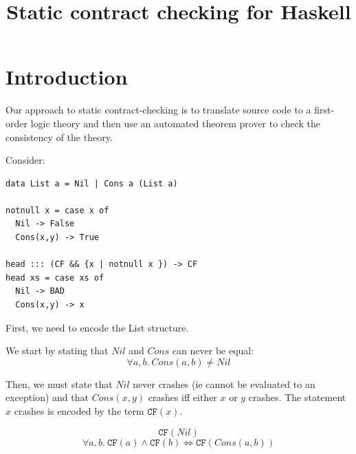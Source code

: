 \documentclass[preprint]{sigplanconf}
\begin{document}
\newcommand{\etrans}[1]{\mathcal{E} \llbracket #1 \rrbracket}
\newcommand{\dtrans}[1]{\mathcal{D} \llbracket #1 \rrbracket}
\newcommand{\ttrans}[1]{\mathcal{T} \llbracket #1 \rrbracket}
\newcommand{\strans}[1]{\mathcal{S} \llbracket #1 \rrbracket}
\newcommand{\trans}[1]{\llbracket #1 \rrbracket}

\newcommand{\unr}{\texttt{UNR}}
\newcommand{\bad}{\texttt{BAD}}
\newcommand{\any}{\texttt{Any}}
\newcommand{\ok}{\texttt{Ok}}
\newcommand{\hprime}{\mathcal{H}'}
\newcommand{\cf}[1]{\texttt{CF}(#1)}
\newcommand{\cfc}{\texttt{CF}}

\title{Static contract checking for Haskell}
\maketitle

\section{Introduction}

Our approach to static contract-checking is to translate source code
to a first-order logic theory and then use an automated theorem prover
to check the consistency of the theory.

Consider:
\begin{verbatim}
data List a = Nil | Cons a (List a)

notnull x = case x of
  Nil -> False
  Cons(x,y) -> True

head ::: (CF && {x | notnull x }) -> CF
head xs = case xs of
  Nil -> BAD
  Cons(x,y) -> x
\end{verbatim}

First, we need to encode the List structure. 

We start by stating that $Nil$ and $Cons$ can never be equal:
\begin{equation*}
\forall a,b.~Cons(a,b) \neq Nil
\end{equation*}

Then, we must state that $Nil$ never crashes (ie cannot be evaluated
to an exception) and that $Cons(x,y)$ crashes iff either $x$ or $y$
crashes. The statement $x$ crashes is encoded by the term $\cf{x}$.

\begin{equation*}
\cf{Nil}
\end{equation*}
\begin{equation}
  \label{cfcons}
\forall a,b.~\cf{a} \land \cf{b} \iff \cf{Cons(a,b)}
\end{equation}
\end{document}
